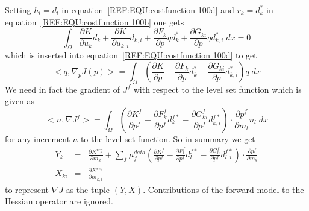 Setting $h_l=d_l$ in equation~\ref{REF:EQU:costfunction 100d} and
$r_k=d^*_k$ in equation~\ref{REF:EQU:costfunction 100b} one gets
\begin{equation}\label{ref:EQU:costfunction:601}
\int_{\Omega}
\displaystyle{\frac{\partial K }{\partial u_k }  } d_k +
\displaystyle{\frac{\partial K }{\partial u_{k,i} }  } d_{k,i}+
\displaystyle{\frac{\partial F_k }{\partial p} } q d^*_k +
\displaystyle{\frac{\partial G_{ki}}{\partial p} } q d^*_{k,i}  
\; dx = 0  
\end{equation} 
which is inserted into equation~\ref{REF:EQU:costfunction 100d} to get
\begin{equation}\label{REF:EQU:costfunction 602}
<q, \nabla_{p} J(p)> =    \int_{\Omega} \left(
\displaystyle{\frac{\partial K }{\partial p }  } - \displaystyle{\frac{\partial F_k }{\partial p} } d^*_k
- \displaystyle{\frac{\partial G_{ki}}{\partial p} }  d^*_{k,i} \right) q \; dx
\end{equation}
We need in fact the gradient of $J^f$ with respect to the level set function which is given as
\begin{equation}\label{REF:EQU:costfunction 603}
<n, \nabla J^f> =    \int_{\Omega} \left(
\displaystyle{\frac{\partial K^f}{\partial p^f}  } - \displaystyle{\frac{\partial F^f_k }{\partial p^f} } d^{f*}_k
- \displaystyle{\frac{\partial G^f_{ki}}{\partial p^f} }  d^{f*}_{k,i} \right) 
\cdot \displaystyle{\frac{\partial p^f }{\partial m_l} } n_l \; dx
\end{equation}
for any increment $n$ to the level set function. So in summary we get  
\begin{equation}\label{ref:EQU:CS:101b}
\begin{array}{rcl}
  Y_k & = & \displaystyle{\frac{\partial K^{reg}}{\partial m_k}} + 
 \sum_{f} \mu^{data}_{f} \left(
\displaystyle{\frac{\partial K^f}{\partial p^f}  } - \displaystyle{\frac{\partial F^f_l }{\partial p^f} } d^{f*}_l
- \displaystyle{\frac{\partial G^f_{li}}{\partial p^f} }  d^{f*}_{l,i} \right) 
\cdot \displaystyle{\frac{\partial p^f }{\partial m_k} } 

\\
   X_{ki} & = & \displaystyle{\frac{\partial K^{reg}}{\partial m_{k,i}}} 
\end{array}
\end{equation} 
to represent $\nabla J$ as the tuple $(Y,X)$. Contributions of the forward model to the 
Hessian operator are ignored.

